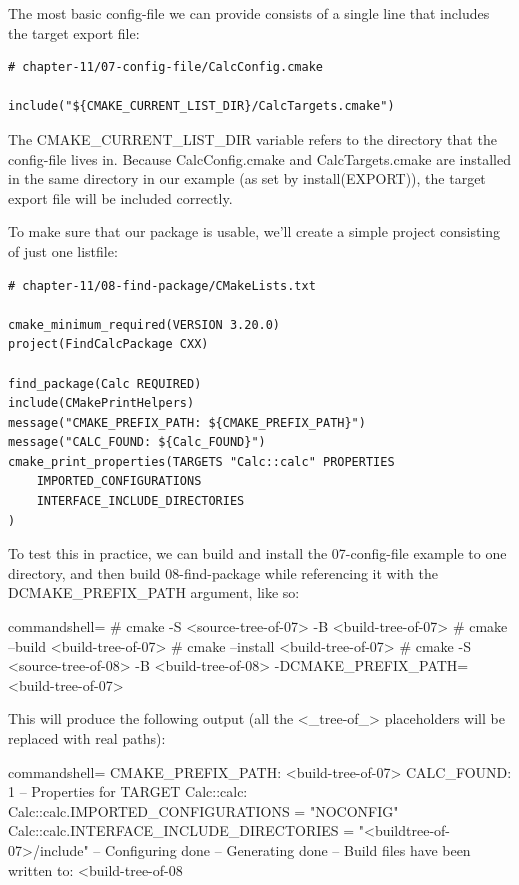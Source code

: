 The most basic config-file we can provide consists of a single line that includes the target export file:

\begin{lstlisting}[style=styleCMake]
# chapter-11/07-config-file/CalcConfig.cmake

include("${CMAKE_CURRENT_LIST_DIR}/CalcTargets.cmake")
\end{lstlisting}

The CMAKE\_CURRENT\_LIST\_DIR variable refers to the directory that the config-file lives in. Because CalcConfig.cmake and CalcTargets.cmake are installed in the same directory in our example (as set by install(EXPORT)), the target export file will be included correctly.

To make sure that our package is usable, we'll create a simple project consisting of just one listfile:

\begin{lstlisting}[style=styleCMake]
# chapter-11/08-find-package/CMakeLists.txt

cmake_minimum_required(VERSION 3.20.0)
project(FindCalcPackage CXX)

find_package(Calc REQUIRED)
include(CMakePrintHelpers)
message("CMAKE_PREFIX_PATH: ${CMAKE_PREFIX_PATH}")
message("CALC_FOUND: ${Calc_FOUND}")
cmake_print_properties(TARGETS "Calc::calc" PROPERTIES
	IMPORTED_CONFIGURATIONS
	INTERFACE_INCLUDE_DIRECTORIES
)
\end{lstlisting}

To test this in practice, we can build and install the 07-config-file example to one directory, and then build 08-find-package while referencing it with the DCMAKE\_PREFIX\_PATH argument, like so:

\begin{tcblisting}{commandshell={}}
# cmake -S <source-tree-of-07> -B <build-tree-of-07>
# cmake --build <build-tree-of-07>
# cmake --install <build-tree-of-07>
# cmake -S <source-tree-of-08> -B <build-tree-of-08>
  -DCMAKE_PREFIX_PATH=<build-tree-of-07>
\end{tcblisting}

This will produce the following output (all the <\_tree-of\_> placeholders will be replaced with real paths):

\begin{tcblisting}{commandshell={}}
CMAKE_PREFIX_PATH: <build-tree-of-07>
CALC_FOUND: 1
--
  Properties for TARGET Calc::calc:
    Calc::calc.IMPORTED_CONFIGURATIONS = "NOCONFIG"
    Calc::calc.INTERFACE_INCLUDE_DIRECTORIES = 
      "<buildtree-of-07>/include"
-- Configuring done
-- Generating done
-- Build files have been written to: <build-tree-of-08
\end{tcblisting}

